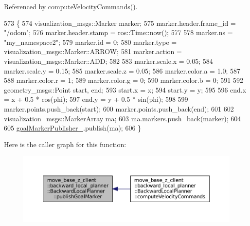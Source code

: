Referenced by compute\+Velocity\+Commands().


\begin{DoxyCode}
573 \{
574     visualization\_msgs::Marker marker;
575     marker.header.frame\_id = \textcolor{stringliteral}{"/odom"};
576     marker.header.stamp = ros::Time::now();
577 
578     marker.ns = \textcolor{stringliteral}{"my\_namespace2"};
579     marker.id = 0;
580     marker.type = visualization\_msgs::Marker::ARROW;
581     marker.action = visualization\_msgs::Marker::ADD;
582 
583     marker.scale.x = 0.05;
584     marker.scale.y = 0.15;
585     marker.scale.z = 0.05;
586     marker.color.a = 1.0;
587 
588     marker.color.r = 1;
589     marker.color.g = 0;
590     marker.color.b = 0;
591 
592     geometry\_msgs::Point start, end;
593     start.x = x;
594     start.y = y;
595 
596     end.x = x + 0.5 * cos(phi);
597     end.y = y + 0.5 * sin(phi);
598 
599     marker.points.push\_back(start);
600     marker.points.push\_back(end);
601 
602     visualization\_msgs::MarkerArray ma;
603     ma.markers.push\_back(marker);
604 
605     \hyperlink{classmove__base__z__client_1_1backward__local__planner_1_1BackwardLocalPlanner_a7228d3fe90bc48b486e5c46d6ac5e815}{goalMarkerPublisher\_}.publish(ma);
606 \}
\end{DoxyCode}
Here is the caller graph for this function\+:
\nopagebreak
\begin{figure}[H]
\begin{center}
\leavevmode
\includegraphics[width=350pt]{classmove__base__z__client_1_1backward__local__planner_1_1BackwardLocalPlanner_a691e565d33666d2f7004e791cae29b42_icgraph}
\end{center}
\end{figure}
\mbox{\label{classmove__base__z__client_1_1backward__local__planner_1_1BackwardLocalPlanner_a3b08865dc8e19750273d971336ecba3b}} 
